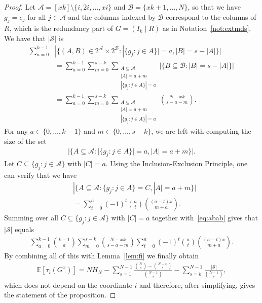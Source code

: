 \documentclass[11pt,a4paper,reqno,twoside]{amsart}
\theoremstyle{definition}
\newcommand{\E}{\mathbb{E}}
\newcommand{\mS}{\mathcal{S}}
\newcommand{\mA}{\mathcal{A}}
\newcommand{\mB}{\mathcal{B}}
\begin{document}
\begin{proof}
    Let $\mA=[xk]\setminus\{i,2i,\dots,xi\}$ and $\mB=\{xk+1,\dots,N\}$, so that we have $g_j=e_j$ for all $j \in \mA$ and the columns indexed by $\mB$ correspond to the columns of $R$, which is the redundancy part of $G=(I_k \mid R)$ as in Notation~\ref{not:extmds}.
    We have that $|\mS|$ is
    \begin{align} \label{eq:abab}
         \sum_{a=0}^{k-1} & |\{(A,B) \in 2^{\mA} \times 2^{\mB}  : |\{ g_j : j \in A\}|=a, |B| = s-|A|\}| \nonumber \\
        &=\sum_{a=0}^{k-1}\sum_{m=0}^{s-k}\sum_{\substack{A \subseteq \mA \\ |A|=a+m \\ |\{ g_j : j \in A\}|=a}}|\{B \subseteq \mB :   |B| = s-|A|\}| \nonumber \\
        &= \sum_{a=0}^{k-1}\sum_{m=0}^{s-k}\sum_{\substack{A \subseteq \mA \\ |A|=a+m \\ |\{ g_j : j \in A\}|=a}} \binom{N-xk}{s-a-m}.
    \end{align}
    For any $a \in \{0, \dots, k-1\}$ and $m \in \{0,\dots,s-k\}$, we are left with computing the size of the set
    \begin{align*}
        |\{A \subseteq \mA : |\{ g_j : j \in A\}|=a, |A|=a+m\}|.
    \end{align*}
    Let $C \subseteq \{g_j : j \in \mA\}$ with $|C|=a$. Using the Inclusion-Exclusion Principle, one can verify that we have
    \begin{align*}
        &|\{A \subseteq \mA : \{ g_j : j \in A\}=C, |A|=a+m\}| \\
        &= \sum_{t=0}^a(-1)^t\binom{a}{t}\binom{(a-t)x}{m+a}.
    \end{align*}
    Summing over all $C \subseteq \{g_j : j \in \mA\}$ with $|C|=a$ together with~\eqref{eq:abab} gives that $|\mS|$ equals
    \begin{align*}
      \sum_{a=0}^{k-1}\binom{k-1}{a} \sum_{m=0}^{s-k}\binom{N-xk}{s-a-m}\sum_{t=0}^a(-1)^t\binom{a}{t}\binom{(a-t)x}{m+a}.
    \end{align*}
By combining all of this
with Lemma~\ref{lem:fi} we finally obtain
\begin{align*}
\E[\tau_i(G^x)] = NH_N-\sum_{s=1}^{N-1}\frac{\binom{N}{s}-\binom{N-x}{s}}{\binom{N-1}{s}}-\sum_{s=k}^{N-1}\frac{|\mS|}{\binom{N-1}{s}},
\end{align*}
which does not depend on the coordinate $i$ and therefore, after simplifying, gives the statement of the proposition.

\end{proof}
\end{document}
